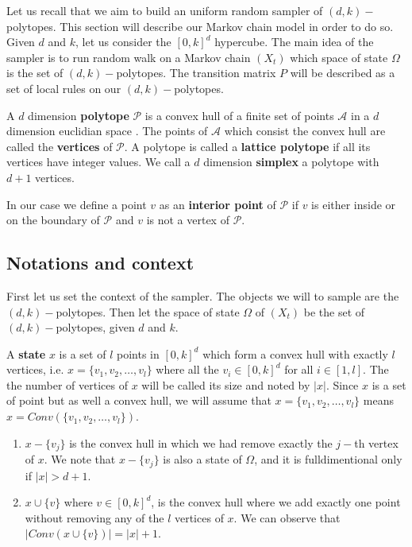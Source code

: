 \documentclass[11pt]{article}
\begin{document}
Let us recall that we aim to build an uniform random sampler of $(d,k)-$polytopes. This section will describe our Markov chain model in order to do so. Given $d$ and $k$, let us consider the $[0,k]^d$ hypercube. The main idea of the sampler is to run random walk on a Markov chain $(X_t)$ which space of state $\Omega$ is the set of $(d,k)-$polytopes. The transition matrix $P$ will be described as a set of local rules on our $(d,k)-$polytopes.

A $d$ dimension \textbf{polytope} $\mathcal{P}$ is a convex hull of a finite set of points $\mathcal{A}$ in a $d$ dimension euclidian space . The points of $\mathcal{A}$ which consist the convex hull are called the \textbf{vertices} of $\mathcal{P}$. A polytope is called a \textbf{lattice polytope} if all its vertices have integer values. We call a $d$ dimension \textbf{simplex} a polytope with $d+1$ vertices.

In our case we define a point $v$ as an \textbf{interior point} of $\mathcal{P}$ if $v$ is either inside or on the boundary of $\mathcal{P}$ and $v$ is not a vertex of $\mathcal{P}$.

\subsection{Notations and context}

First let us set the context of the sampler. The objects we will to sample are the $(d,k)-$polytopes. Then let the space of state $\Omega$ of $(X_t)$ be the set of $(d,k)-$polytopes, given $d$ and $k$.

A \textbf{state} $x$ is a set of $l$ points in $[0,k]^d$ which form a convex hull with exactly $l$ vertices, i.e. $x=\{v_1, v_2, …, v_l\}$ where all the $v_i\in[0,k]^d$ for all $i \in [1,l]$. The the number of vertices of $x$ will be called its size and noted by $|x|$. Since $x$ is a set of point but as well a convex hull, we will assume that $x=\{v_1, v_2, …, v_l\}$ means $x=Conv(\{v_1, v_2, …, v_l\})$.

\begin{enumerate}
  \item $x-\{v_j\}$ is the convex hull in which we had remove exactly the $j-$th vertex of $x$. We note that $x-\{v_j\}$ is also a state of $\Omega$, and it is fulldimentional only if $|x|>d+1$.
  \item $x \cup \{v\}$ where $v \in [0,k]^d$, is the convex hull where we add exactly one point without removing any of the $l$ vertices of $x$. We can observe that $|Conv(x \cup \{v\})| = |x| + 1$.
\end{enumerate}
\end{document}
